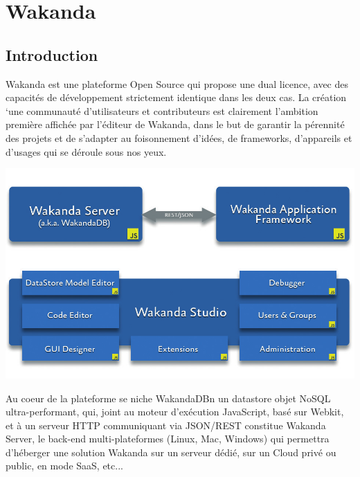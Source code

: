 \chapter{Wakanda}
\label{ch:wakanda}

\section*{Introduction}

Wakanda est une plateforme Open Source qui propose une dual licence, avec des capacités de développement strictement identique dans les deux cas. La création ‘une communauté d’utilisateurs et contributeurs est clairement l’ambition première affichée par l’éditeur de Wakanda, dans le but de garantir la pérennité des projets et de s’adapter au foisonnement d’idées, de frameworks, d’appareils et d’usages qui se déroule sous nos yeux.


 
\begin{center}
\includegraphics[scale=0.4]{img/wakanda.png}
\label{Plateforme Wakanda}
\end{center}




Au coeur de la plateforme se niche WakandaDBn un datastore objet NoSQL ultra-performant, qui, joint au moteur d’exécution JavaScript, basé sur Webkit, et à un serveur HTTP communiquant via JSON/REST constitue Wakanda Server, le back-end multi-plateformes (Linux, Mac, Windows) qui permettra d’héberger une solution Wakanda sur un serveur dédié, sur un Cloud privé ou public, en mode SaaS, etc...

